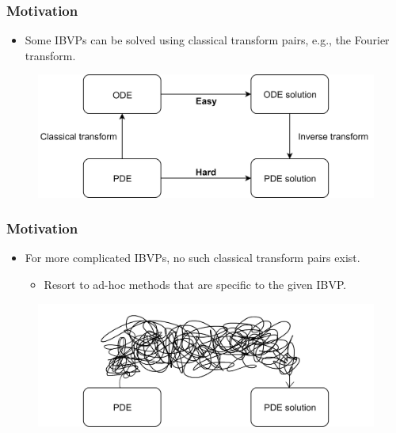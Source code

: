 \documentclass{beamer}
\begin{document}
\begin{frame}
    \frametitle{Motivation}
    \begin{itemize}
        \item Some IBVPs can be solved using classical transform pairs, e.g., the Fourier transform. 
    \end{itemize}
    \begin{figure}[htpb!]
        \centering
        \includegraphics[width=1\textwidth]{classical_transform.png}
        \label{fig:classical_transform}
    \end{figure}
\end{frame}

\begin{frame}
    \frametitle{Motivation}
    \begin{itemize}
        \item For more complicated IBVPs, no such classical transform pairs exist. 
        \begin{itemize}
            \item Resort to ad-hoc methods that are specific to the given IBVP.
        \end{itemize}
    \end{itemize}
    \begin{figure}[htpb!]
        \centering
        \includegraphics[width=1\textwidth]{transform_pairs_no_transform_pair.png}
    \end{figure}
\end{frame}
\end{document}
